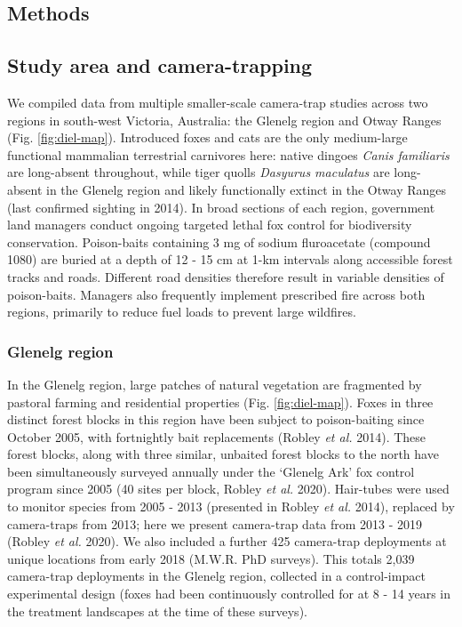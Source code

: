 \documentclass[11pt,a4paper,titlepage,twoside,openright]{style/unimelbthesis}
\begin{document}
\begin{mainmatter}
\newpage

\hypertarget{methods-3}{%
\section{Methods}\label{methods-3}}

\hypertarget{study-area-and-camera-trapping}{%
\subsection{Study area and camera-trapping}\label{study-area-and-camera-trapping}}

We compiled data from multiple smaller-scale camera-trap studies across two regions in south-west Victoria, Australia: the Glenelg region and Otway Ranges (Fig. \ref{fig:diel-map}). Introduced foxes and cats are the only medium-large functional mammalian terrestrial carnivores here: native dingoes \emph{Canis familiaris} are long-absent throughout, while tiger quolls \emph{Dasyurus maculatus} are long-absent in the Glenelg region and likely functionally extinct in the Otway Ranges (last confirmed sighting in 2014). In broad sections of each region, government land managers conduct ongoing targeted lethal fox control for biodiversity conservation. Poison-baits containing 3 mg of sodium fluroacetate (compound 1080) are buried at a depth of 12 - 15 cm at 1-km intervals along accessible forest tracks and roads. Different road densities therefore result in variable densities of poison-baits. Managers also frequently implement prescribed fire across both regions, primarily to reduce fuel loads to prevent large wildfires.

\hypertarget{glenelg-region-2}{%
\subsubsection{Glenelg region}\label{glenelg-region-2}}

In the Glenelg region, large patches of natural vegetation are fragmented by pastoral farming and residential properties (Fig. \ref{fig:diel-map}). Foxes in three distinct forest blocks in this region have been subject to poison-baiting since October 2005, with fortnightly bait replacements (Robley \emph{et al.} 2014). These forest blocks, along with three similar, unbaited forest blocks to the north have been simultaneously surveyed annually under the `Glenelg Ark' fox control program since 2005 (40 sites per block, Robley \emph{et al.} 2020). Hair-tubes were used to monitor species from 2005 - 2013 (presented in Robley \emph{et al.} 2014), replaced by camera-traps from 2013; here we present camera-trap data from 2013 - 2019 (Robley \emph{et al.} 2020). We also included a further 425 camera-trap deployments at unique locations from early 2018 (M.W.R. PhD surveys). This totals 2,039 camera-trap deployments in the Glenelg region, collected in a control-impact experimental design (foxes had been continuously controlled for at 8 - 14 years in the treatment landscapes at the time of these surveys).


\end{mainmatter}
\end{document}
